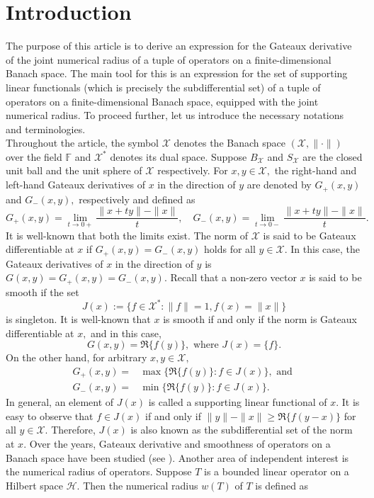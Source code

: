 \documentclass{amsart}
\theoremstyle{definition}
\theoremstyle{remark}
\numberwithin{equation}{section}
\begin{document}
\section{Introduction}
The purpose of this article is to derive an expression for the Gateaux derivative of the  joint numerical radius of a tuple of operators on a finite-dimensional Banach space. The main tool for this is an expression for the set of supporting linear functionals (which is precisely the subdifferential set) of a tuple of operators on a finite-dimensional Banach space, equipped with the joint numerical radius. To proceed further, let us introduce the necessary notations and terminologies.\\
Throughout the article, the symbol $\mathcal{X}$ denotes the Banach space $(\mathcal{X},\|\cdot \|)$ over the field $\mathbb{F}$ and $\mathcal{X}^*$ denotes its dual space. Suppose $B_\mathcal{X}$ and $S_{\mathcal{X}}$ are the closed unit ball and the unit sphere of $\mathcal{X}$ respectively. For $x,y\in \mathcal{X},$ the right-hand and left-hand Gateaux derivatives of $x$ in the direction of $y$ are denoted by $G_+(x,y)$ and $G_-(x,y),$ respectively and defined as 
\[G_+(x,y)=\lim_{t\to 0+}\frac{\|x+ty\|-\|x\|}{t},\quad G_-(x,y)=\lim_{t\to 0-}\frac{\|x+ty\|-\|x\|}{t}.\]
It is well-known that both the limits exist. The norm of $\mathcal{X}$ is said to be Gateaux differentiable at $x$ if $G_+(x,y)=G_-(x,y)$ holds for all $y\in \mathcal{X}.$  In this case, the Gateaux derivatives of $x$ in the direction of $y$ is $G(x,y)=G_+(x,y)=G_-(x,y).$ Recall that a non-zero vector $x$ is said to be smooth if the set $$J(x):=\{f\in \mathcal{X}^*:\|f\|=1,f(x)=\|x\|\}$$ is singleton. It is well-known that $x$ is smooth if and only if the norm is Gateaux differentiable at $x,$ and in this case, 
\[G(x,y)=\Re\{f(y)\}, \text{ where } J(x)=\{f\}.\] On the other hand, for arbitrary $x,y\in \mathcal{X},$
\begin{equation}\label{eq-03}
	\begin{split}
	G_+(x,y)=&\max\{\Re\{f(y)\}:f\in J(x)\}, \text{ and } \\
	G_-(x,y)=&\min\{\Re\{f(y)\}:f\in J(x)\}.
	\end{split}
\end{equation} 
In general, an element of $J(x)$ is called a supporting linear functional of $x.$ It is easy to observe that $f\in J(x)$ if and only if $\|y\|-\|x\|\geq \Re\{f(y-x)\}$ for all $y\in \mathcal{X}.$ Therefore, $J(x)$ is also known as the subdifferential set of the norm at $x.$ Over the years, Gateaux derivative and smoothness of operators on a Banach space have been studied (see \cite{A,H,K,MPS,S}).  Another area of independent interest is the numerical radius of operators. Suppose $T$ is a bounded linear operator on a Hilbert space $\mathcal{H}.$ Then the numerical radius $w(T)$ of $T$ is defined as 
\end{document}
